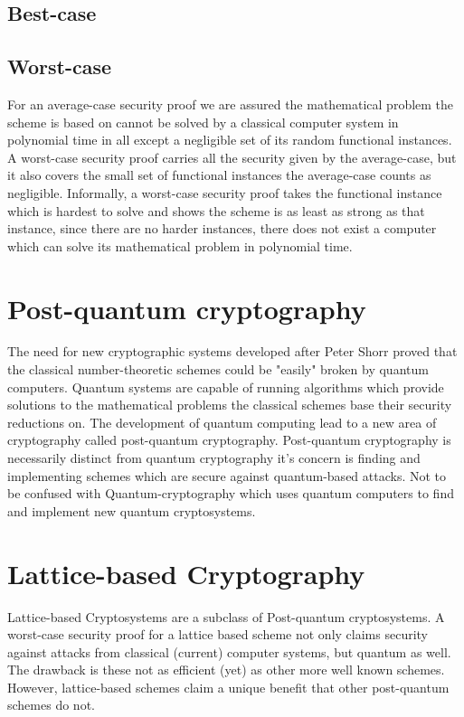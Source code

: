 \subsection{Best-case}

\subsection{Worst-case} 
For an average-case security proof we are assured the mathematical problem
the scheme is based on cannot be solved by a classical computer system in polynomial time in all except a negligible set of its random functional instances.
A worst-case security proof carries all the security given by the average-case, but it also covers the small set of functional instances the average-case counts as negligible. 
\newline
Informally, a worst-case security proof takes the functional instance which is
hardest to solve and shows the scheme is as least as strong as that
instance, since there are no harder instances, there does not exist
a computer which can solve its mathematical problem in polynomial time.

\section{Post-quantum cryptography} 
The need for new cryptographic systems developed after Peter Shorr proved that the classical number-theoretic schemes could be "easily" broken by quantum computers. Quantum systems are capable of running algorithms which provide solutions to the mathematical problems the classical schemes base their security reductions on. The development of quantum computing lead to a new area of cryptography called post-quantum cryptography. 
\newline 
Post-quantum cryptography is necessarily distinct from quantum cryptography it's concern is finding and implementing schemes which are secure against quantum-based attacks.
\newline 
Not to be confused with Quantum-cryptography which uses quantum computers to find and implement new quantum cryptosystems.

\section{Lattice-based Cryptography} 
Lattice-based Cryptosystems are a subclass of Post-quantum cryptosystems. A worst-case security proof for a lattice based scheme not only claims security against attacks from classical (current) computer systems, but quantum as well. The drawback is these not as efficient (yet) as other more well known schemes. However, lattice-based schemes claim a unique benefit that other post-quantum schemes do not. 

